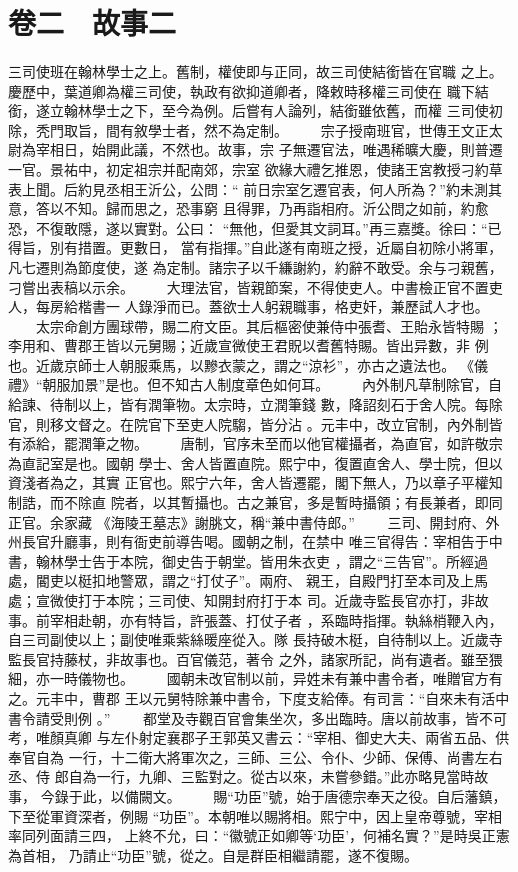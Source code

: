 \documentclass{ctexart}
\begin{document}
\section{卷二　故事二}
\paragraph{}
三司使班在翰林學士之上。舊制，權使即与正同，故三司使結銜皆在官職 之上。慶歷中，葉道卿為權三司使，執政有欲抑道卿者，降敕時移權三司使在 職下結銜，遂立翰林學士之下，至今為例。后嘗有人論列，結銜雖依舊，而權 三司使初除，秃門取旨，間有敘學士者，然不為定制。 　　宗子授南班官，世傳王文正太尉為宰相日，始開此議，不然也。故事，宗 子無遷官法，唯遇稀曠大慶，則普遷一官。景祐中，初定祖宗并配南郊，宗室 欲緣大禮乞推恩，使諸王宮教授刁約草表上聞。后約見丞相王沂公，公問：`` 前日宗室乞遷官表，何人所為？''約未測其意，答以不知。歸而思之，恐事窮 且得罪，乃再詣相府。沂公問之如前，約愈恐，不復敢隱，遂以實對。公曰： ``無他，但愛其文詞耳。''再三嘉獎。徐曰：``已得旨，別有措置。更數日， 當有指揮。''自此遂有南班之授，近屬自初除小將軍，凡七遷則為節度使，遂 為定制。諸宗子以千縑謝約，約辭不敢受。余与刁親舊，刁嘗出表稿以示余。 　　大理法官，皆親節案，不得使吏人。中書檢正官不置吏人，每房給楷書一 人錄淨而已。蓋欲士人躬親職事，格吏奸，兼歷試人才也。 　　太宗命創方團球帶，賜二府文臣。其后樞密使兼侍中張耆、王貽永皆特賜 ；李用和、曹郡王皆以元舅賜；近歲宣微使王君貺以耆舊特賜。皆出异數，非 例也。近歲京師士人朝服乘馬，以黲衣蒙之，謂之``涼衫''，亦古之遺法也。 《儀禮》``朝服加景''是也。但不知古人制度章色如何耳。 　　內外制凡草制除官，自給諫、待制以上，皆有潤筆物。太宗時，立潤筆錢 數，降詔刻石于舍人院。每除官，則移文督之。在院官下至吏人院騶，皆分沾 。元丰中，改立官制，內外制皆有添給，罷潤筆之物。 　　唐制，官序未至而以他官權攝者，為直官，如許敬宗為直記室是也。國朝 學士、舍人皆置直院。熙宁中，復置直舍人、學士院，但以資淺者為之，其實 正官也。熙宁六年，舍人皆遷罷，閣下無人，乃以章子平權知制誥，而不除直 院者，以其暫攝也。古之兼官，多是暫時攝領；有長兼者，即同正官。余家藏 《海陵王墓志》謝朓文，稱``兼中書侍郎。'' 　　三司、開封府、外州長官升廳事，則有衙吏前導告喝。國朝之制，在禁中 唯三官得告：宰相告于中書，翰林學士告于本院，御史告于朝堂。皆用朱衣吏 ，謂之``三告官''。所經過處，閽吏以梃扣地警眾，謂之``打仗子''。兩府、 親王，自殿門打至本司及上馬處；宣微使打于本院；三司使、知開封府打于本 司。近歲寺監長官亦打，非故事。前宰相赴朝，亦有特旨，許張蓋、打仗子者 ，系臨時指揮。執絲梢鞭入內，自三司副使以上；副使唯乘紫絲暖座從入。隊 長持破木梃，自待制以上。近歲寺監長官持藤杖，非故事也。百官儀范，著令 之外，諸家所記，尚有遺者。雖至猥細，亦一時儀物也。 　　國朝未改官制以前，异姓未有兼中書令者，唯贈官方有之。元丰中，曹郡 王以元舅特除兼中書令，下度支給俸。有司言：``自來未有活中書令請受則例 。'' 　　都堂及寺觀百官會集坐次，多出臨時。唐以前故事，皆不可考，唯顏真卿 与左仆射定襄郡子王郭英又書云：``宰相、御史大夫、兩省五品、供奉官自為 一行，十二衛大將軍次之，三師、三公、令仆、少師、保傅、尚書左右丞、侍 郎自為一行，九卿、三監對之。從古以來，未嘗參錯。''此亦略見當時故事， 今錄于此，以備闕文。 　　賜``功臣''號，始于唐德宗奉天之役。自后藩鎮，下至從軍資深者，例賜 ``功臣''。本朝唯以賜將相。熙宁中，因上皇帝尊號，宰相率同列面請三四， 上終不允，曰：``徽號正如卿等`功臣'，何補名實？''是時吳正憲為首相， 乃請止``功臣''號，從之。自是群臣相繼請罷，遂不復賜。
\clearpage
\end{document}

